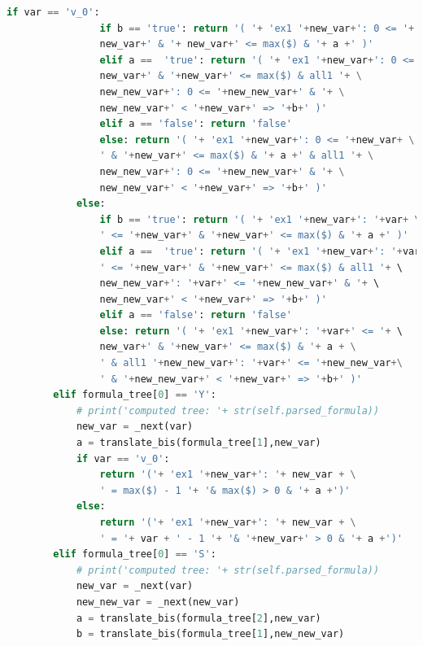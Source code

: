 \begin{lstlisting}[language=Python, style=Python, escapechar = £,  label={code:ltlf2dfa-translate-method}, caption={The \texttt{translate} method.}]
            if var == 'v_0':
                if b == 'true': return '( '+ 'ex1 '+new_var+': 0 <= '+ \
                new_var+' & '+ new_var+' <= max($) & '+ a +' )'
                elif a ==  'true': return '( '+ 'ex1 '+new_var+': 0 <= '+ \
                new_var+' & '+new_var+' <= max($) & all1 '+ \
                new_new_var+': 0 <= '+new_new_var+' & '+ \
                new_new_var+' < '+new_var+' => '+b+' )'
                elif a == 'false': return 'false'
                else: return '( '+ 'ex1 '+new_var+': 0 <= '+new_var+ \
                ' & '+new_var+' <= max($) & '+ a +' & all1 '+ \
                new_new_var+': 0 <= '+new_new_var+' & '+ \
                new_new_var+' < '+new_var+' => '+b+' )'
            else:
                if b == 'true': return '( '+ 'ex1 '+new_var+': '+var+ \
                ' <= '+new_var+' & '+new_var+' <= max($) & '+ a +' )'
                elif a ==  'true': return '( '+ 'ex1 '+new_var+': '+var+ \
                ' <= '+new_var+' & '+new_var+' <= max($) & all1 '+ \ 
                new_new_var+': '+var+' <= '+new_new_var+' & '+ \ 
                new_new_var+' < '+new_var+' => '+b+' )'
                elif a == 'false': return 'false'
                else: return '( '+ 'ex1 '+new_var+': '+var+' <= '+ \ 
                new_var+' & '+new_var+' <= max($) & '+ a + \
                ' & all1 '+new_new_var+': '+var+' <= '+new_new_var+\
                ' & '+new_new_var+' < '+new_var+' => '+b+' )'
        elif formula_tree[0] == 'Y':
            # print('computed tree: '+ str(self.parsed_formula))
            new_var = _next(var)
            a = translate_bis(formula_tree[1],new_var)
            if var == 'v_0':
                return '('+ 'ex1 '+new_var+': '+ new_var + \
                ' = max($) - 1 '+ '& max($) > 0 & '+ a +')'
            else:
                return '('+ 'ex1 '+new_var+': '+ new_var + \
                ' = '+ var + ' - 1 '+ '& '+new_var+' > 0 & '+ a +')'
        elif formula_tree[0] == 'S':
            # print('computed tree: '+ str(self.parsed_formula))
            new_var = _next(var)
            new_new_var = _next(new_var)
            a = translate_bis(formula_tree[2],new_var)
            b = translate_bis(formula_tree[1],new_new_var)


\end{lstlisting}

